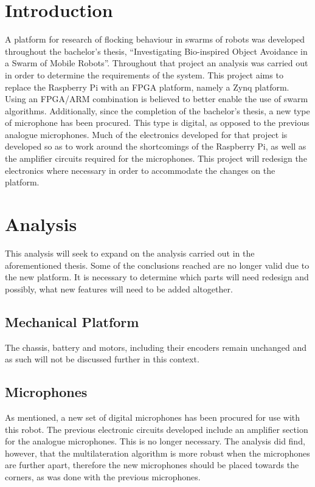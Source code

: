 
\section{Introduction}
A platform for research of flocking behaviour in swarms of robots was developed throughout the bachelor's thesis, ``Investigating Bio-inspired Object Avoidance in a Swarm of Mobile Robots''.
Throughout that project an analysis was carried out in order to determine the requirements of the system.
This project aims to replace the Raspberry Pi with an FPGA platform, namely a Zynq platform.
Using an FPGA/ARM combination is believed to better enable the use of swarm algorithms.
Additionally, since the completion of the bachelor's thesis, a new type of microphone has been procured.
This type is digital, as opposed to the previous analogue microphones.
Much of the electronics developed for that project is developed so as to work around the shortcomings of the Raspberry Pi, as well as the amplifier circuits required for the microphones.
This project will redesign the electronics where necessary in order to accommodate the changes on the platform.

\section{Analysis} %
\label{sec:analysis}
This analysis will seek to expand on the analysis carried out in the aforementioned thesis.
Some of the conclusions reached are no longer valid due to the new platform.
It is necessary to determine which parts will need redesign and possibly, what new features will need to be added altogether.

\subsection{Mechanical Platform} %
\label{sub:mechanical_platform}
The chassis, battery and motors, including their encoders remain unchanged and as such will not be discussed further in this context.

\subsection{Microphones} %
\label{sub:microphones}
As mentioned, a new set of digital microphones has been procured for use with this robot.
The previous electronic circuits developed include an amplifier section for the analogue microphones.
This is no longer necessary.
The analysis did find, however, that the multilateration algorithm is more robust when the microphones are further apart, therefore the new microphones should be placed towards the corners, as was done with the previous microphones.

